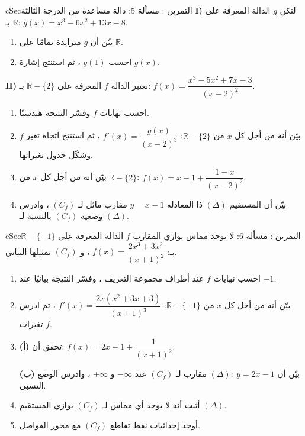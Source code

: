 \documentclass[12pt,a4paper]{article}
\newenvironment{BOX}[2]{\begin{otherlanguage}{english}\begin{arbox}{#1}{#2}}{\end{arbox}\end{otherlanguage}}
\newcounter{exo}
\newenvironment{tamrin}[1]{\stepcounter{exo}\begin{BOX}{cSec}{التمرين \theexo: #1}}{\end{BOX}}
\newcommand{\R}{\mathbb{R}}
\newcommand{\pa}{\par\smallskip\textbf{(أ)} }\newcommand{\pb}{\par\smallskip\textbf{(ب)} }\newcommand{\pc}{\par\smallskip\textbf{(جـ)} }\newcommand{\pd}{\par\smallskip\textbf{(د)} }\newcommand{\pe}{\par\smallskip\textbf{(هـ)} }
\begin{document}
\begin{tamrin}{مسألة 5: دالة مساعدة من الدرجة الثالثة}
\textbf{I)} لتكن $g$ الدالة المعرفة على $\R$ بـ: $g(x)=x^3-6x^2+13x-8$.
\begin{enumerate}
\item بيّن أن $g$ متزايدة تمامًا على $\R$.
\item احسب $g(1)$ ، ثم استنتج إشارة $g(x)$.
\end{enumerate}
\textbf{II)} نعتبر الدالة $f$ المعرفة على $\R-\{2\}$ بـ: $f(x)=\dfrac{x^3-5x^2+7x-3}{(x-2)^2}$.
\begin{enumerate}[resume]
\item احسب نهايات $f$ وفسّر النتيجة هندسيًا.
\item بيّن أنه من أجل كل $x$ من $\R-\{2\}$: $f'(x)=\dfrac{g(x)}{(x-2)^3}$ ، ثم استنتج اتجاه تغير $f$ وشكّل جدول تغيراتها.
\item بيّن أنه من أجل كل $x$ من $\R-\{2\}$: $f(x)=x-1+\dfrac{1-x}{(x-2)^2}$.
\item بيّن أن المستقيم $(\Delta)$ ذا المعادلة $y=x-1$ مقارب مائل لـ $(C_f)$ ، وادرس وضعية $(C_f)$ بالنسبة لـ $(\Delta)$.
\end{enumerate}
\end{tamrin}

\begin{tamrin}{مسألة 6: لا يوجد مماس يوازي المقارب}
$f$ الدالة المعرفة على $\R-\{-1\}$ بـ: $f(x)=\dfrac{2x^3+3x^2}{(x+1)^2}$ ، و $(C_f)$ تمثيلها البياني.
\begin{enumerate}
\item احسب نهايات $f$ عند أطراف مجموعة التعريف ، وفسّر النتيجة بيانيًا عند $-1$.
\item بيّن أنه من أجل كل $x$ من $\R-\{-1\}$: $f'(x)=\dfrac{2x\left(x^2+3x+3\right)}{(x+1)^3}$ ، ثم ادرس تغيرات $f$.
\item \pa تحقق أن: $f(x)=2x-1+\dfrac1{(x+1)^2}$.
\pb بيّن أن $(\Delta):\ y=2x-1$ مقارب لـ $(C_f)$ عند $-\infty$ و $+\infty$ ، وادرس الوضع النسبي.
\item أثبت أنه لا يوجد أي مماس لـ $(C_f)$ يوازي المستقيم $(\Delta)$.
\item أوجد إحداثيات نقط تقاطع $(C_f)$ مع محور الفواصل.
\end{enumerate}
\end{tamrin}

\end{document}
